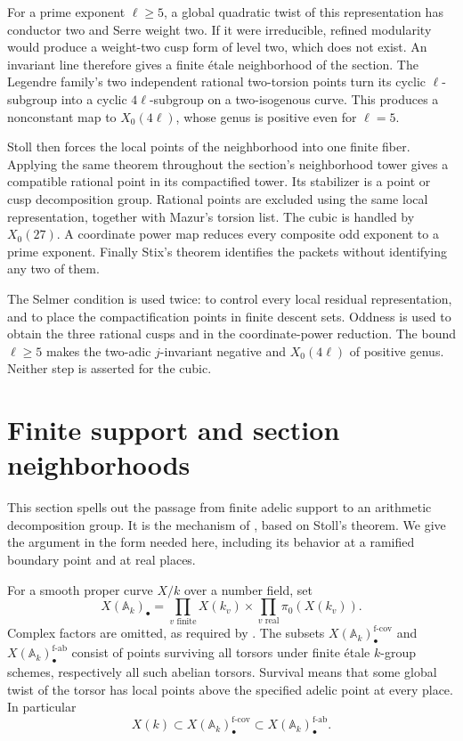 \documentclass[11pt,a4paper]{article}
\newcommand{\A}{\mathbb A}
\newcommand{\et}{\'et}
\newcommand{\fcov}{\mathrm{f\text{-}cov}}
\newcommand{\fab}{\mathrm{f\text{-}ab}}
\theoremstyle{plain}
\theoremstyle{definition}
\begin{document}
For a prime exponent $\ell\geq5$, a global quadratic twist of this
representation has conductor two and Serre weight two. If it were
irreducible, refined modularity would produce a weight-two cusp form of
level two, which does not exist. An invariant line therefore gives a
finite \et ale neighborhood of the section. The Legendre family's two
independent rational two-torsion points turn its cyclic $\ell$-subgroup
into a cyclic $4\ell$-subgroup on a two-isogenous curve. This produces a
nonconstant map to $X_0(4\ell)$, whose genus is positive even for $\ell=5$.

Stoll then forces the local points of the neighborhood into one finite
fiber. Applying the same theorem throughout the section's neighborhood
tower gives a compatible rational point in its compactified tower. Its
stabilizer is a point or cusp decomposition group. Rational points are
excluded using the same local representation, together with Mazur's
torsion list. The cubic is handled by $X_0(27)$. A coordinate power map
reduces every composite odd exponent to a prime exponent. Finally Stix's
theorem identifies the packets without identifying any two of them.

The Selmer condition is used twice: to control every local residual
representation, and to place the compactification points in finite
descent sets. Oddness is used to obtain the three rational cusps and in
the coordinate-power reduction. The bound $\ell\geq5$ makes the
two-adic $j$-invariant negative and $X_0(4\ell)$ of positive genus.
Neither step is asserted for the cubic.

\section{Finite support and section neighborhoods}\label{sec:finite}

This section spells out the passage from finite adelic support to an
arithmetic decomposition group. It is the mechanism of
\citet[Lemma~3.16 and Proposition~3.17]{steklov}, based on Stoll's
theorem. We give the argument in the form needed here, including its
behavior at a ramified boundary point and at real places.

For a smooth proper curve $X/k$ over a number field, set
\[
 X(\A_k)_\bullet=
 \prod_{v\text{ finite}}X(k_v)\times
 \prod_{v\text{ real}}\pi_0(X(k_v)).
\]
Complex factors are omitted, as required by
\citet[\S1]{stollerrata}. The subsets
$X(\A_k)_\bullet^{\fcov}$ and
$X(\A_k)_\bullet^{\fab}$ consist of points surviving all torsors under
finite \et ale $k$-group schemes, respectively all such abelian torsors.
Survival means that some global twist of the torsor has local points
above the specified adelic point at every place. In particular
\begin{equation}\label{eq:descentinclusion}
 X(k)\subset X(\A_k)_\bullet^{\fcov}
 \subset X(\A_k)_\bullet^{\fab}.
\end{equation}
\end{document}
